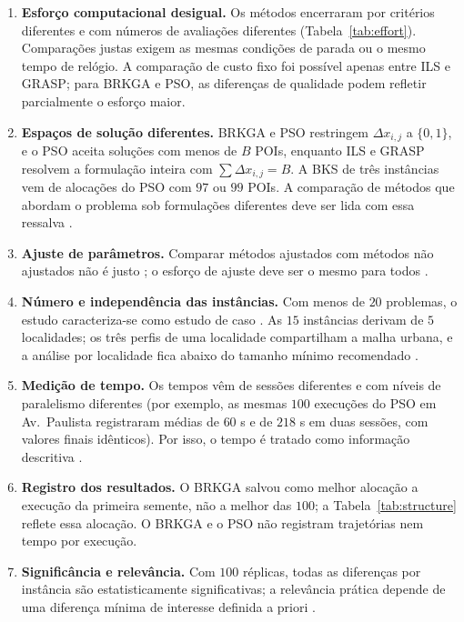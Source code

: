 \begin{enumerate}
\item \textbf{Esforço computacional desigual.} Os métodos encerraram por critérios diferentes e com
números de avaliações diferentes (Tabela~\ref{tab:effort}). Comparações justas exigem as mesmas
condições de parada \cite[Sec.~4.4]{beiranvand2017best} ou o mesmo tempo de relógio. A comparação de
custo fixo foi possível apenas entre ILS e GRASP; para BRKGA e PSO, as diferenças de qualidade podem
refletir parcialmente o esforço maior.
\item \textbf{Espaços de solução diferentes.} BRKGA e PSO restringem $\Delta x_{i,j}$ a $\{0,1\}$, e o PSO
aceita soluções com menos de $B$ POIs, enquanto ILS e GRASP resolvem a formulação inteira com
$\sum\Delta x_{i,j}=B$. A BKS de três instâncias vem de alocações do PSO com $97$ ou $99$ POIs. A
comparação de métodos que abordam o problema sob formulações diferentes deve ser lida com essa
ressalva \cite[Sec.~7]{beiranvand2017best}.
\item \textbf{Ajuste de parâmetros.} Comparar métodos ajustados com métodos não ajustados não é justo
\cite[Sec.~2.6.3]{bartzbeielstein2010future}; o esforço de ajuste deve ser o mesmo para todos
\cite[Sec.~8]{eiben2011parameter}. 
\item \textbf{Número e independência das instâncias.} Com menos de $20$ problemas, o estudo
caracteriza-se como estudo de caso \cite[Sec.~3]{beiranvand2017best}. As $15$ instâncias derivam de
$5$ localidades; os três perfis de uma localidade compartilham a malha urbana, e a análise por
localidade fica abaixo do tamanho mínimo recomendado \cite[Sec.~6.1]{derrac2011practical}.
\item \textbf{Medição de tempo.} Os tempos vêm de sessões diferentes e com níveis de paralelismo
diferentes (por exemplo, as mesmas $100$ execuções do PSO em Av.~Paulista registraram médias de $60$ s
e de $218$ s em duas sessões, com valores finais idênticos). Por isso, o tempo é tratado como
informação descritiva \cite[Sec.~4.1]{beiranvand2017best}.
\item \textbf{Registro dos resultados.} O BRKGA salvou como melhor alocação a execução da primeira
semente, não a melhor das $100$; a Tabela~\ref{tab:structure} reflete essa alocação. O BRKGA e o PSO não
registram trajetórias nem tempo por execução.
\item \textbf{Significância e relevância.} Com $100$ réplicas, todas as diferenças por instância são
estatisticamente significativas; a relevância prática depende de uma diferença mínima de interesse
definida a priori \cite[Secs.~1.4 e 2.5.6]{bartzbeielstein2010experimental}.
\end{enumerate}
